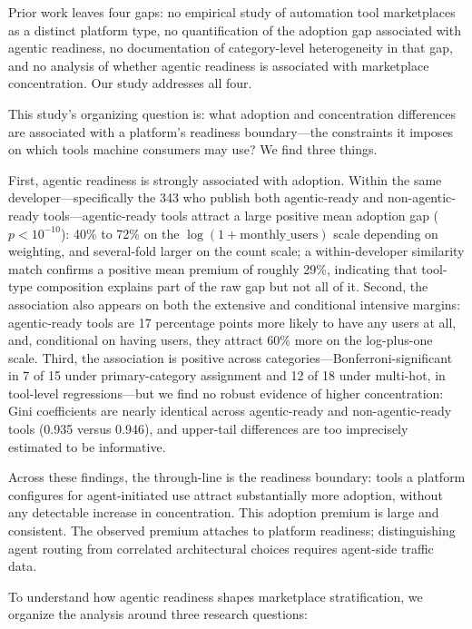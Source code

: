 Prior work leaves four gaps: no empirical study of automation tool marketplaces
as a distinct platform type, no quantification of the adoption gap associated
with agentic readiness, no documentation of category-level heterogeneity in
that gap, and no analysis of whether agentic readiness is associated with
marketplace concentration. Our study addresses all four.

This study's organizing question is: what adoption and concentration
differences are associated with a platform's readiness boundary---the
constraints it imposes on which tools machine consumers may use? We find three
things.

First, agentic readiness is strongly associated with adoption. Within the same
developer---specifically the 343 who publish both agentic-ready and
non-agentic-ready tools---agentic-ready tools attract a large positive mean
adoption gap ($p < 10^{-10}$): 40\% to 72\% on the
$\log(1+\text{monthly\_users})$ scale depending on weighting, and several-fold
larger on the count scale; a within-developer similarity match confirms a positive mean premium of roughly 29\%,
indicating that tool-type composition explains part of the raw gap but not all of it. Second, the association also appears on both the
extensive and conditional intensive margins: agentic-ready tools are 17
percentage points more likely to have any users at all, and, conditional on
having users, they attract 60\% more on the log-plus-one scale. Third, the
association is positive across
categories---Bonferroni-significant in 7 of 15 under primary-category assignment
and 12 of 18 under multi-hot, in tool-level regressions---but we find no robust
evidence of higher concentration: Gini coefficients are nearly identical across
agentic-ready and non-agentic-ready tools (0.935 versus 0.946), and upper-tail
differences are too imprecisely estimated to be informative.

Across these findings, the through-line is the readiness boundary: tools a
platform configures for agent-initiated use attract substantially more
adoption, without any detectable increase in concentration. This adoption
premium is large and
consistent. The observed premium attaches to platform readiness; distinguishing agent routing from correlated architectural choices requires agent-side traffic data.

To understand how agentic readiness shapes marketplace stratification, we
organize the analysis around three research questions:

